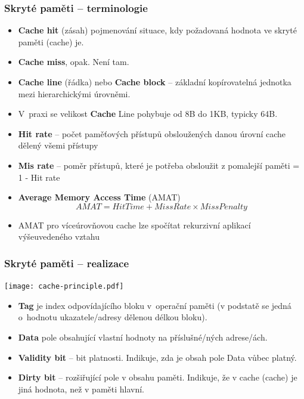 \documentclass{beamer}
\begin{document}
\begin{frame}
\frametitle{Skryté paměti -- terminologie}

\begin{itemize}
\item \textbf{Cache hit} (zásah) pojmenování situace, kdy požadovaná hodnota ve skryté paměti (cache) je.
\item \textbf{Cache miss}, opak. Není tam.
\item \textbf{Cache line} (řádka) nebo \textbf{Cache block} – základní kopírovatelná jednotka mezi hierarchickými úrovněmi. 
\item V praxi se velikost \textbf{Cache} Line pohybuje od 8B do 1KB, typicky 64B.
\item \textbf{Hit rate} -- počet paměťových přístupů obsloužených danou úrovní cache dělený všemi přístupy
\item \textbf{Mis rate} -- poměr přístupů, které je potřeba obsloužit z pomalejší paměti = 1 - Hit rate
\item \textbf{Average Memory Access Time} (AMAT) $$AMAT = Hit Time + Miss Rate \times Miss Penalty$$
\item AMAT pro víceúrovňovou cache lze spočítat rekurzivní aplikací výšeuvedeného vztahu
\end{itemize}

\end{frame}

\begin{frame}
\frametitle{Skryté paměti -- realizace}
{
\centering

\texttt{[image: cache-principle.pdf]}

}
\vskip 2mm

\begin{itemize}
\item \textbf{Tag} je index odpovídajícího bloku v operační paměti (v podstatě se jedná o hodnotu ukazatele/adresy dělenou délkou bloku).
\item \textbf{Data} pole obsahující vlastní hodnoty na příslušné/ných adrese/ách.
\item \textbf{Validity bit} – bit platnosti. Indikuje, zda je obsah pole Data vůbec platný.  
\item \textbf{Dirty bit} – rozšiřující pole v obsahu paměti. Indikuje, že v cache (cache) je jiná hodnota, než v paměti hlavní.
\end{itemize}

\end{frame}
\end{document}
